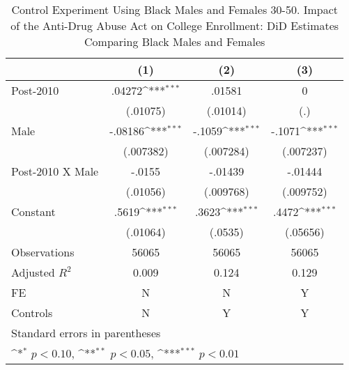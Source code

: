 \begin{table}[htbp]\centering
\def\sym#1{\ifmmode^{#1}\else\(^{#1}\)\fi}
\caption{Control Experiment Using Black Males and Females 30-50. Impact of the Anti-Drug Abuse Act on College Enrollment: DiD Estimates Comparing Black Males and Females}
\begin{tabular}{l*{3}{c}}
\hline\hline
                    &\multicolumn{1}{c}{(1)}         &\multicolumn{1}{c}{(2)}         &\multicolumn{1}{c}{(3)}         \\
\hline
Post-2010           &      .04272\sym{***}&      .01581         &           0         \\
                    &    (.01075)         &    (.01014)         &         (.)         \\
[1em]
Male                &     -.08186\sym{***}&      -.1059\sym{***}&      -.1071\sym{***}\\
                    &   (.007382)         &   (.007284)         &   (.007237)         \\
[1em]
Post-2010 X Male    &      -.0155         &     -.01439         &     -.01444         \\
                    &    (.01056)         &   (.009768)         &   (.009752)         \\
[1em]
Constant            &       .5619\sym{***}&       .3623\sym{***}&       .4472\sym{***}\\
                    &    (.01064)         &     (.0535)         &    (.05656)         \\
\hline
Observations        &       56065         &       56065         &       56065         \\
Adjusted \(R^{2}\)  &       0.009         &       0.124         &       0.129         \\
FE                  &           N         &           N         &           Y         \\
Controls            &           N         &           Y         &           Y         \\
\hline\hline
\multicolumn{4}{l}{\footnotesize Standard errors in parentheses}\\
\multicolumn{4}{l}{\footnotesize \sym{*} \(p<0.10\), \sym{**} \(p<0.05\), \sym{***} \(p<0.01\)}\\
\end{tabular}
\end{table}
